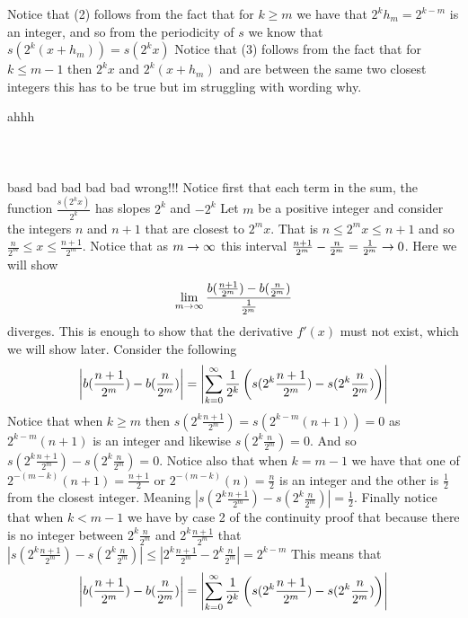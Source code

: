 \documentclass[12pt]{amsart}
\begin{document}
\begin{itemize}
      Notice that (2) follows from the fact that for $k\geq m$ we have that $2^kh_m=2^{k-m}$ is an integer, and so from the periodicity of $s$ we know that $s(2^k(x+h_m))=s(2^kx)$
      Notice that (3) follows from the fact that for $k\leq m-1$ then $2^{k}x$ and $2^{k}(x+h_m)$ and are between the same two closest integers this has to be true but im struggling with wording why.







      ahhh\\\\\\\\basd bad bad bad bad wrong!!!
      Notice first that each term in the sum, the function $\frac{s(2^kx)}{2^k}$ has slopes $2^k$ and $-2^k$
      Let $m$ be a positive integer and consider the integers $n$ and $n+1$ that are closest to $2^mx$. 
      That is $n\leq 2^mx\leq n+1$ and so $\frac{n}{2^m}\leq x\leq \frac{n+1}{2^m}$. Notice that as 
      $m\rightarrow \infty$ this interval $\frac{n+1}{2^m}-\frac{n}{2^m}=\frac{1}{2^m}\rightarrow 0$. Here we will show 
      \[\lim_{m\rightarrow\infty}\frac{b(\frac{n+1}{2^m})-b(\frac{n}{2^m})}{\frac{1}{2^m}}\] diverges. 
      This is enough to show that the derivative $f'(x)$ must not exist, which we will show later.
      Consider the following 
      \[\left\vert b(\frac{n+1}{2^m})-b(\frac{n}{2^m}) \right\vert=\left\vert \sum_{k=0}^\infty\frac{1}{2^k}\left(s(2^k\frac{n+1}{2^m})-s(2^k\frac{n}{2^m})\right) \right\vert\]
      Notice that when $k\geq m$ then $s(2^k\frac{n+1}{2^m})=s(2^{k-m}(n+1))=0$ as $2^{k-m}(n+1)$ is an integer and likewise $s(2^k\frac{n}{2^m})=0$.
      And so $s(2^k\frac{n+1}{2^m})-s(2^k\frac{n}{2^m})=0$. Notice also that when $k=m-1$ we have that one of $2^{-(m-k)}(n+1)=\frac{n+1}{2}$ or $2^{-(m-k)}(n)=\frac{n}{2}$ 
      is an integer and the other is $\frac{1}{2}$ from the closest integer. Meaning $|s(2^k\frac{n+1}{2^m})-s(2^k\frac{n}{2^m})|= \frac{1}{2}$. 
      Finally notice that when $k<m-1$ we have by case 2 of the continuity proof that because there is no integer between $2^k\frac{n}{2^m}$ and 
      $2^k\frac{n+1}{2^m}$ that $|s(2^k\frac{n+1}{2^m})-s(2^k\frac{n}{2^m})|\leq |2^k\frac{n+1}{2^m}-2^k\frac{n}{2^m}|=2^{k-m}$ This means that
      \begin{align*}
         \abs{b(\frac{n+1}{2^m})-b(\frac{n}{2^m})}&=\abs{\sum_{k=0}^\infty\frac{1}{2^k}\left(s(2^k\frac{n+1}{2^m})-s(2^k\frac{n}{2^m})\right)}\\

\end{align*}
\end{itemize}
\end{document}
